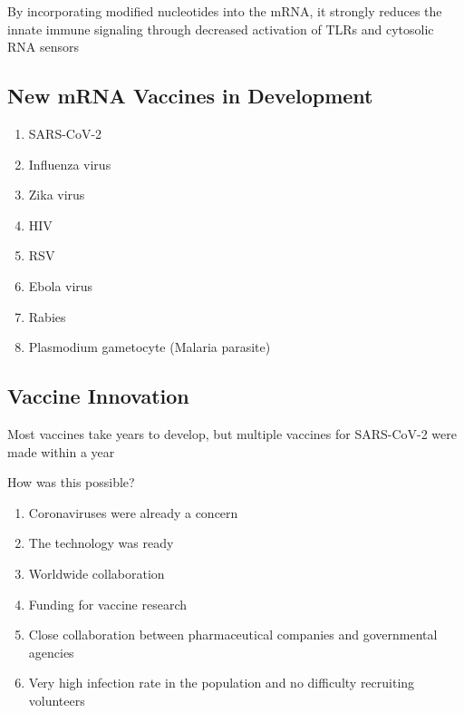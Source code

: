 \documentclass{notes}
\begin{document}
\tab \indicates By incorporating modified nucleotides into the mRNA, it strongly reduces the innate immune signaling through decreased activation of TLRs and cytosolic RNA sensors

\subsection{New mRNA Vaccines in Development}

\begin{enumerate}
    \item SARS-CoV-2
    \item Influenza virus
    \item Zika virus
    \item HIV
    \item RSV
    \item Ebola virus
    \item Rabies
    \item Plasmodium gametocyte (Malaria parasite)
\end{enumerate}

\subsection{Vaccine Innovation}

Most vaccines take years to develop, but multiple vaccines for SARS-CoV-2 were made within a year

How was this possible?

\begin{enumerate}
    \item Coronaviruses were already a concern
    \item The technology was ready
    \item Worldwide collaboration
    \item Funding for vaccine research
    \item Close collaboration between pharmaceutical companies and governmental agencies
    \item Very high infection rate in the population and no difficulty recruiting volunteers
\end{enumerate}
\end{document}
